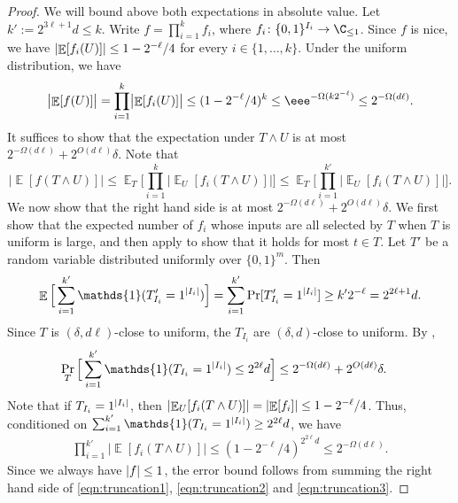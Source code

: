 \documentclass{toc}
\newcommand{\zo}{\{0,1\}}
\def\Blocklength{\ell}
\def\1{\mathds{1}}
\DeclarePairedDelimiter{\abs}{\lvert}{\rvert}
\DeclareMathOperator*{\E}{\mathbb{E}}                 %
\begin{document}
  \begin{proof}
    We will bound above both expectations in absolute value.
    Let $k' := 2^{3\Blocklength+1} d \le k$.
    Write $f = \prod_{i=1}^k f_i$, where $f_i\colon \zo^{I_i} \to \C_{\le 1}$.
		Since $f$ is nice, we have $\abs{\E[f_i(U)]} \le 1 - 2^{-\Blocklength} / 4$ for every $i \in \{1, \ldots, k\}$.
   	Under the uniform distribution, we have 
    \begin{align}
      \bigl| \E[f(U)] \bigr|
      = \prod_{i=1}^k \bigl| \E[f_i(U)] \bigr|
			\le (1 - 2^{-\Blocklength} / 4)^k
			\le \eee^{- \Omega(k 2^{-\Blocklength})}
      \le 2^{-\Omega(d\Blocklength)} . \label{eqn:truncation1}
    \end{align}
    It suffices to show that the expectation under $T \wedge U$ is at most $2^{-\Omega(d\Blocklength)} + 2^{O(d\Blocklength)} \delta$.
		Note that 
    \[
      \bigl| \E[f(T \wedge U)] \bigr|
      \le \E_T \Big[ \prod_{i=1}^k \bigl| \E_U[f_i(T \wedge U)] \bigr| \Big]
      \le \E_T \Big[ \prod_{i=1}^{k'} \bigl| \E_U[f_i(T \wedge U)] \bigr| \Big] .
    \]
    We now show that the right hand side is at most $2^{-\Omega(d\Blocklength)} + 2^{O(d\Blocklength)} \delta$.
    We first show that the expected number of $f_i$ whose inputs are all selected by $T$ when $T$ is uniform is large, and then apply  to show that it holds for most $t \in T$.
    Let $T'$ be a random variable distributed uniformly over $\zo^m$.
    Then
    \[
      \E \Big[ \sum_{i=1}^{k'} \1(T'_{I_i} = 1^{\abs{I_i}}) \Big]
      = \sum_{i=1}^{k'} \Pr[T'_{I_i} = 1^{\abs{I_i}}]
      \ge k' 2^{-\Blocklength}
			= 2^{2\Blocklength+1} d .
    \]
    Since $T$ is $(\delta, d\Blocklength)$-close to uniform, the $T_{I_i}$ are $(\delta, d)$-close to uniform.
    By ,
    \begin{align}
      \Pr_T \Big[ \sum_{i=1}^{k'} \1(T_{I_i} = 1^{\abs{I_i}}) \le 2^{2\Blocklength}d  \Big]
      &\le 2^{-\Omega(d\Blocklength)} + 2^{O(d\Blocklength)} \delta . \label{eqn:truncation2}
    \end{align}
    Note that if $T_{I_i} = 1^{\abs{I_i}}$, then $\abs{\E_U[ f_i(T \wedge U)]} = \abs{\E[f_i]} \le 1 - 2^{-\Blocklength}/4$.
    Thus, conditioned on $\sum_{i=1}^{k'} \1(T_{I_i} = 1^{\abs{I_i}}) \ge 2^{2\Blocklength} d$, we have
    \begin{align}
      \prod_{i=1}^{k'} \bigl| \E[f_i(T \wedge U)] \bigr|
      \le (1 - 2^{-\Blocklength}/4)^{ 2^{2\Blocklength} d }
      \le 2^{-\Omega(d\Blocklength)} . \label{eqn:truncation3}
    \end{align}
		Since we always have $\abs{f} \le 1$, the error bound follows from summing the right hand side of \eqref{eqn:truncation1}, \eqref{eqn:truncation2} and \eqref{eqn:truncation3}.
  \end{proof}
\end{document}
